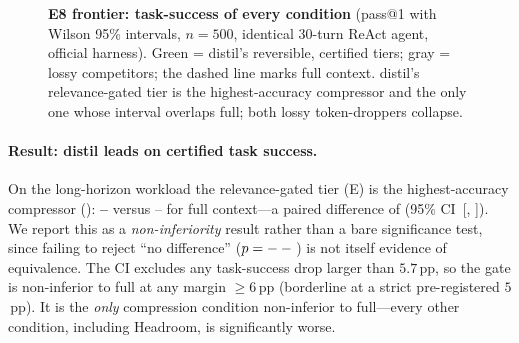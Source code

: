 \documentclass[11pt]{article}
\newcommand{\sweEeightFullPass}{--}\newcommand{\sweEeightFullResolved}{--}%
\newcommand{\sweEeightGatedPass}{--}\newcommand{\sweEeightGatedResolved}{--}%
\begin{document}
\begin{figure}[t]
\centering
{}
\caption{\textbf{E8 frontier: task-success of every condition} (pass@1 with Wilson 95\%
intervals, $n{=}500$, identical 30-turn ReAct agent, official harness). \textcolor{distilgreen}{Green}
= distil's reversible, certified tiers; \textcolor{distilgray}{gray} = lossy competitors; the
dashed line marks full context. distil's relevance-gated tier is the highest-accuracy
compressor and the only one whose interval overlaps full; both lossy token-droppers collapse.}
\label{fig:e8frontier}
\end{figure}

\paragraph{Result: distil leads on certified task success.} On the long-horizon workload the
relevance-gated tier (E) is the highest-accuracy compressor ():
\textbf{\sweEeightGatedPass{}}
versus \sweEeightFullPass{} for full context---a paired difference of \sweEeightGatedNIDelta{}
(95\% CI~[\sweEeightGatedNICIlo, \sweEeightGatedNICIhi]). We report this as a
\emph{non-inferiority} result rather than a bare significance test, since failing to reject
``no difference'' ($p=--{}$) is not itself evidence of equivalence. The
CI excludes any task-success drop larger than $5.7$\,pp, so the gate is non-inferior to full
at any margin $\ge$6\,pp (borderline at a strict pre-registered $5$\,pp). It is the
\emph{only} compression condition non-inferior to full---every other condition, including
Headroom, is significantly worse.
\end{document}
